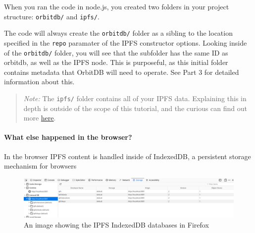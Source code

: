 When you ran the code in node.js, you created two folders in your
project structure: \texttt{\textquotesingle{}orbitdb/} and
\texttt{ipfs/}.

\begin{Shaded}
\begin{Highlighting}[]
\NormalTok{$ }
\NormalTok{$ }

\NormalTok{$ }
\end{Highlighting}
\end{Shaded}

The code will always create the \texttt{orbitdb/} folder as a sibling to
the location specified in the \texttt{repo} paramater of the IPFS
constructor options. Looking inside of the \texttt{orbitdb/} folder, you
will see that the subfolder has the same ID as orbitdb, as well as the
IPFS node. This is purposeful, as this initial folder contains metadata
that OrbitDB will need to operate. See Part 3 for detailed information
about this.

\begin{quote}
\emph{Note:} The \texttt{ipfs/} folder contains all of your IPFS data.
Explaining this in depth is outside of the scope of this tutorial, and
the curious can find out more \protect\hyperlink{}{here}.
\end{quote}

\paragraph{What else happened in the
browser?}\label{what-else-happened-in-the-browser-2}

In the browser IPFS content is handled inside of IndexedDB, a persistent
storage mechanism for browsers

\hypertarget{}{
\begin{figure}
\centering
\includegraphics{../images/ipfs_browser.png}
\caption{An image showing the IPFS IndexedDB databases in Firefox}
\end{figure}
}

